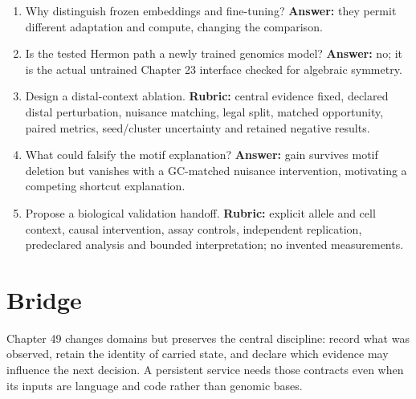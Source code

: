 \begin{enumerate}
not when windows from one donor are dependent; resample the donor groups.
\item Why distinguish frozen embeddings and fine-tuning? \textbf{Answer:}
they permit different adaptation and compute, changing the comparison.
\item Is the tested Hermon path a newly trained genomics model? \textbf{Answer:}
no; it is the actual untrained Chapter 23 interface checked for algebraic symmetry.
\item Design a distal-context ablation. \textbf{Rubric:} central evidence fixed,
declared distal perturbation, nuisance matching, legal split, matched opportunity,
paired metrics, seed/cluster uncertainty and retained negative results.
\item What could falsify the motif explanation? \textbf{Answer:} gain survives
motif deletion but vanishes with a GC-matched nuisance intervention, motivating
a competing shortcut explanation.
\item Propose a biological validation handoff. \textbf{Rubric:} explicit allele
and cell context, causal intervention, assay controls, independent replication,
predeclared analysis and bounded interpretation; no invented measurements.
\end{enumerate}

\section{Bridge}
Chapter 49 changes domains but preserves the central discipline: record what
was observed, retain the identity of carried state, and declare which evidence
may influence the next decision. A persistent service needs those contracts
even when its inputs are language and code rather than genomic bases.
